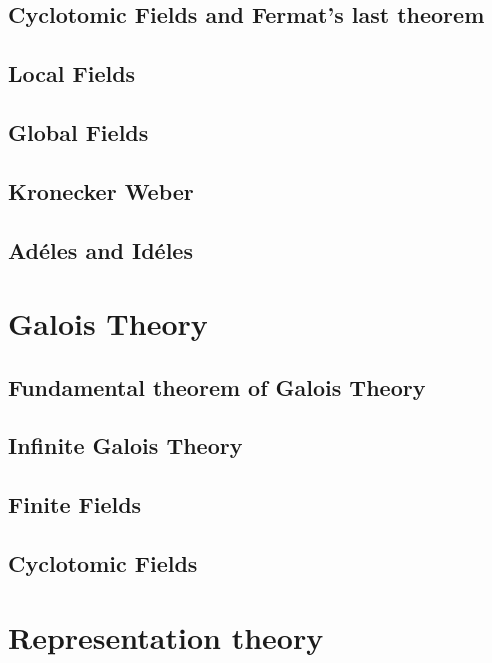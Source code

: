 \documentclass[oneside, 12pt]{scrbook}
\theoremstyle{theorem}
\begin{document}
\chapter{Cyclotomic Fields and Fermat's last theorem}

\chapter{Local Fields}

\chapter{Global Fields}

\chapter{Kronecker Weber}


\chapter{Ad\'{e}les and Id\'{e}les}




\part{Galois Theory}

\chapter{Fundamental theorem of Galois Theory}

\chapter{Infinite Galois Theory}

\chapter{Finite Fields}


\chapter{Cyclotomic Fields}



\part{Representation theory}
\end{document}
